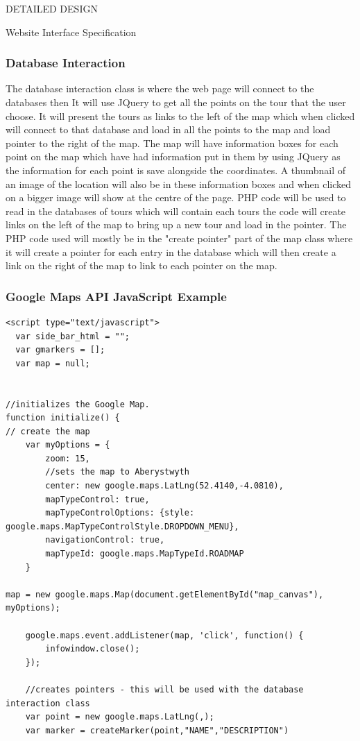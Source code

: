 \documentclass{article}
\begin{document}
\begin{section}{DETAILED DESIGN}
\begin{subsection}{Website Interface Specification}
		\subsubsection{Database Interaction}
			The database interaction class is where the web page will connect to the databases then It will use JQuery to get all the points on the tour that the user choose. It will present the tours as links to the left of the map which when clicked will connect to that database and load in all the points to the map and load pointer to the right of the map. The map will have information boxes for each point on the map which have had information put in them by using JQuery as the information for each point is save alongside the coordinates. A thumbnail of an image of the location will also be in these information boxes and when clicked on a bigger image will show at the centre of the page. PHP code will be used to read in the databases of tours which will contain each tours the code will create links on the left of the map to bring up a new tour and load in the pointer. The PHP code used will mostly be in the "create pointer" part of the map class where it will create a pointer for each entry in the database which will then create a link on the right of the map to link to each pointer on the map.

		\subsubsection{Google Maps API JavaScript Example}
		\begin{lstlisting}[caption=Google Maps API Javascript Example]
<script type="text/javascript"> 
  var side_bar_html = ""; 
  var gmarkers = []; 
  var map = null;
  
  
//initializes the Google Map.
function initialize() {
// create the map
	var myOptions = {
		zoom: 15,
		//sets the map to Aberystwyth
		center: new google.maps.LatLng(52.4140,-4.0810),
		mapTypeControl: true,
		mapTypeControlOptions: {style: google.maps.MapTypeControlStyle.DROPDOWN_MENU},
		navigationControl: true,
		mapTypeId: google.maps.MapTypeId.ROADMAP
	}
	
map = new google.maps.Map(document.getElementById("map_canvas"), myOptions);

	google.maps.event.addListener(map, 'click', function() {
		infowindow.close();
	});

	//creates pointers - this will be used with the database interaction class
	var point = new google.maps.LatLng(,);
	var marker = createMarker(point,"NAME","DESCRIPTION")


\end{lstlisting}
\end{subsection}
\end{section}
\end{document}
